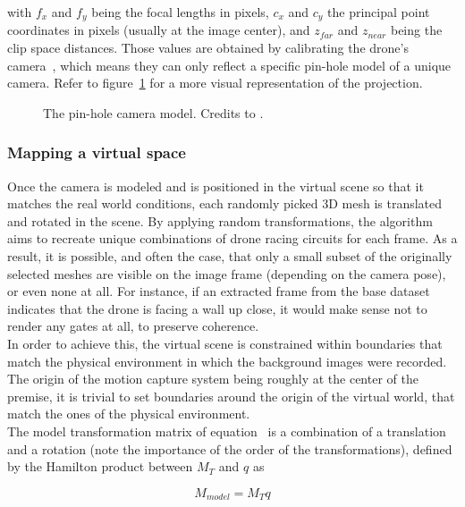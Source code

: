 with $f_x$ and $f_y$ being the focal lengths in pixels, $c_x$ and $c_y$ the
principal point coordinates in pixels (usually at the image center), and
$z_{far}$ and $z_{near}$ being the clip space distances. Those values are
obtained by calibrating the drone's camera~\cite{OpenCVCalibration}, which
means they can only reflect a specific pin-hole model of a unique camera. Refer
to figure~\ref{fig:pinholemodel} for a more visual representation of the
projection.

\begin{figure}[h]
	\center
	\resizebox{350pt}{!}{
		
	}
	\caption[Pin-hole camera model]{The pin-hole camera model. Credits to
	\cite{cfr}.}
	\label{fig:pinholemodel}
\end{figure}


	\subsubsection{Mapping a virtual space}

Once the camera is modeled and is positioned in the virtual scene so
that it matches the real world conditions, each randomly picked 3D mesh is
translated and rotated in the scene. By applying random transformations, the
algorithm aims to recreate unique combinations of drone racing circuits for
each frame. As a result, it is possible, and often the case, that only a small
subset of the originally selected meshes are visible on the image frame
(depending on the camera pose), or even none at all. For instance, if an
extracted frame from the base dataset indicates that the drone is facing a wall
up close, it would make sense not to render any gates at all, to preserve
coherence.\\

In order to achieve this, the virtual scene is constrained within boundaries
that match the physical environment in which the background images were
recorded. The origin of the motion capture system being roughly at the center
of the premise, it is trivial to set boundaries around the origin of the
virtual world, that match the ones of the physical environment.\\

The model transformation matrix of equation~ is a
combination of a translation and a rotation (note the importance of the order
of the transformations), defined by the Hamilton product between $M_T$ and $q$
as

\begin{equation} \label{equ:modelmatrix}
	M_{model} = M_T q 
\end{equation}

